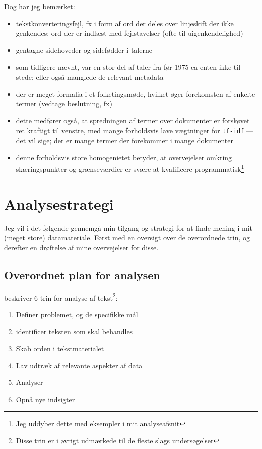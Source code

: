 Dog har jeg bemærket:
\begin{itemize}
  \item
    tekstkonverteringsfejl, fx i form af ord der deles over linjeskift der ikke genkendes; ord der er indlæst med fejlstavelser (ofte til uigenkendelighed)
  \item
    gentagne sidehoveder og sidefødder i talerne
  \item
    som tidligere nævnt, var en stor del af taler fra før 1975 ca enten ikke til stede; eller også manglede de relevant metadata
  \item
    der er meget formalia i et folketingsmøde, hvilket øger forekomsten af enkelte termer (vedtage beslutning, fx)
  \item
    dette medfører også, at spredningen af termer over dokumenter er forskøvet ret kraftigt til venstre, med mange forholdsvis lave vægtninger for \texttt{tf-idf} — det vil sige; der er mange termer der forekommer i mange dokumenter
  \item
    denne forholdsvis store homogenietet betyder, at overvejelser omkring skæringspunkter og grænseværdier er svære at kvalificere programmatisk\footnote{Jeg uddyber dette med eksempler i mit analyseafsnit}
\end{itemize}

\chapter{Analysestrategi}\label{chap:strategy}

Jeg vil i det følgende gennemgå min tilgang og strategi for at finde mening i mit (meget store) datamateriale.
Først med en oversigt over de overordnede trin, og derefter en drøftelse af mine overvejelser for disse. 

\section{Overordnet plan for analysen}\label{sec:plan}

\autocite[s. 17]{kwartlerTextMiningPractice2017} beskriver 6 trin for analyse af tekst\footnote{Disse
  trin er i øvrigt udmærkede til de fleste slags undersøgelser}:
\begin{enumerate}
  \item
    Definer problemet, og de specifikke mål
  \item
    identificer teksten som skal behandles
  \item
    Skab orden i tekstmaterialet
  \item
    Lav udtræk af relevante aspekter af data
  \item
    Analyser
  \item
    Opnå nye indsigter
\end{enumerate}

